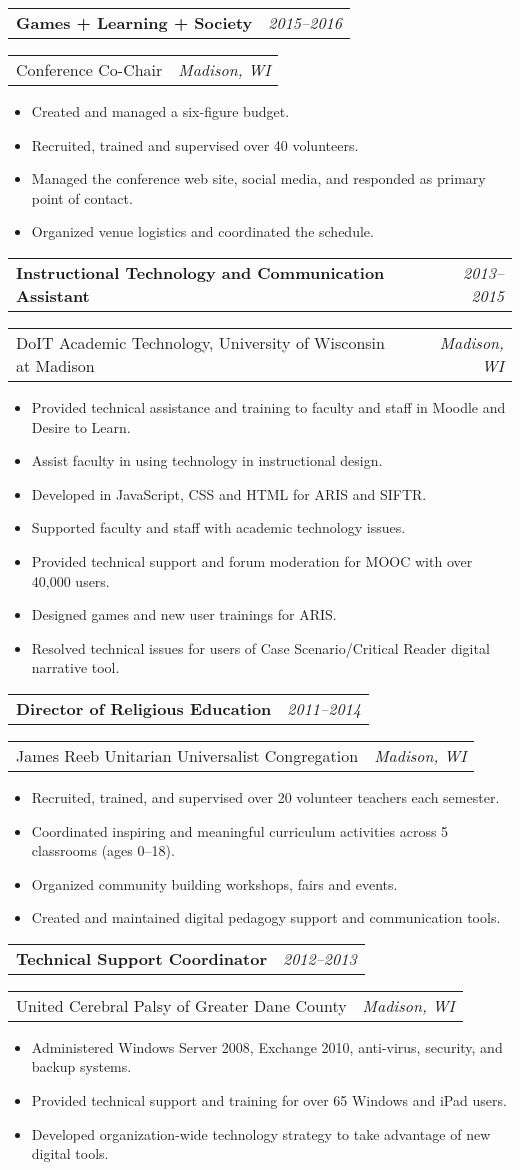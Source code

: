\documentclass[letterpaper,11pt]{article}
\newcommand{\resitem}[1]{\item #1 \vspace{-8pt}}
\newcommand{\ressubheading}[4]{\vspace{4pt}
	\begin{tabularx}{\textwidth}{X r}
		\textbf{#1} & \textit{#4}
	\end{tabularx}

	\begin{tabularx}{\textwidth}{X r}
		#2 & \textit{#3}
	\end{tabularx}\vspace{-6pt}

}
\begin{document}
\ressubheading{Games + Learning + Society }{Conference Co-Chair}{Madison, WI}{2015--2016}
	\begin{itemize}
		\resitem{Created and managed a six-figure budget.}
		\resitem{Recruited, trained and supervised over 40 volunteers.}
		\resitem{Managed the conference web site, social media, and responded as primary point of contact.}
		\resitem{Organized venue logistics and coordinated the schedule.}

	\end{itemize}

	\ressubheading{Instructional Technology and Communication Assistant}{DoIT Academic Technology, University of Wisconsin at Madison}{Madison, WI}{2013--2015}
	\begin{itemize}
		\resitem{Provided technical assistance and training to faculty and staff in Moodle and Desire to Learn.}
		\resitem{Assist faculty in using technology in instructional design.}
		\resitem{Developed in JavaScript, CSS and HTML for ARIS and SIFTR.}
		\resitem{Supported faculty and staff with academic technology issues.}
		\resitem{Provided technical support and forum moderation for MOOC with over 40,000 users.}
		\resitem{Designed games and new user trainings for ARIS.}
		\resitem{Resolved technical issues for users of Case Scenario/Critical Reader digital narrative tool.}

	\end{itemize}

	\ressubheading{Director of Religious Education}{James Reeb Unitarian Universalist Congregation}{Madison, WI}{2011--2014}
	\begin{itemize}
		\resitem{Recruited, trained, and supervised over 20 volunteer teachers each semester.}
		\resitem{Coordinated inspiring and meaningful curriculum activities across 5 classrooms (ages 0--18).}
		\resitem{Organized community building workshops, fairs and events.}
		\resitem{Created and maintained digital pedagogy support and communication tools.}
	\end{itemize}


	\ressubheading{Technical Support Coordinator}{United Cerebral Palsy of Greater Dane County}{Madison, WI}{2012--2013}
	\begin{itemize}
		\resitem{Administered Windows Server 2008, Exchange 2010, anti-virus, security, and backup systems.}
		\resitem{Provided technical support and training for over 65 Windows and iPad users.}
		\resitem{Developed organization-wide technology strategy to take advantage of new digital tools.}
	\end{itemize}
\end{document}

